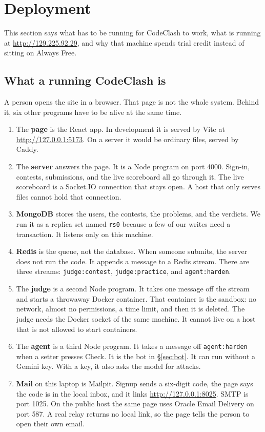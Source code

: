 \documentclass[11pt,a4paper]{article}
\begin{document}
\section{Deployment}
\label{sec:deploy}

This section says what has to be running for CodeClash to work, what is running at \url{http://129.225.92.29}, and why that machine spends trial credit instead of sitting on Always Free.

\subsection{What a running CodeClash is}

A person opens the site in a browser. That page is not the whole system. Behind it, six other programs have to be alive at the same time.

\begin{enumerate}
\item The \textbf{page} is the React app. In development it is served by Vite at \url{http://127.0.0.1:5173}. On a server it would be ordinary files, served by Caddy.
\item The \textbf{server} answers the page. It is a Node program on port 4000. Sign-in, contests, submissions, and the live scoreboard all go through it. The live scoreboard is a Socket.IO connection that stays open. A host that only serves files cannot hold that connection.
\item \textbf{MongoDB} stores the users, the contests, the problems, and the verdicts. We run it as a replica set named \texttt{rs0} because a few of our writes need a transaction. It listens only on this machine.
\item \textbf{Redis} is the queue, not the database. When someone submits, the server does not run the code. It appends a message to a Redis stream. There are three streams: \texttt{judge:contest}, \texttt{judge:practice}, and \texttt{agent:harden}.
\item The \textbf{judge} is a second Node program. It takes one message off the stream and starts a throwaway Docker container. That container is the sandbox: no network, almost no permissions, a time limit, and then it is deleted. The judge needs the Docker socket of the same machine. It cannot live on a host that is not allowed to start containers.
\item The \textbf{agent} is a third Node program. It takes a message off \texttt{agent:harden} when a setter presses Check. It is the bot in \S\ref{sec:bot}. It can run without a Gemini key. With a key, it also asks the model for attacks.
\item \textbf{Mail} on this laptop is Mailpit. Signup sends a six-digit code, the page says the code is in the local inbox, and it links \url{http://127.0.0.1:8025}. SMTP is port 1025. On the public host the same page uses Oracle Email Delivery on port 587. A real relay returns no local link, so the page tells the person to open their own email.
\end{enumerate}
\end{document}
